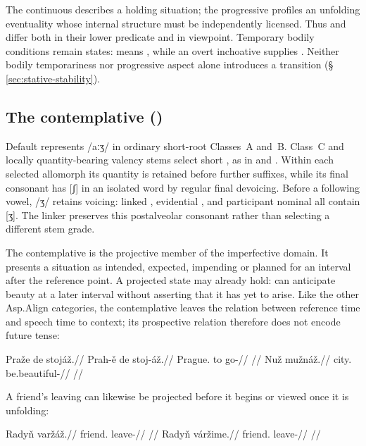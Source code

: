 The continuous describes a holding situation; the progressive profiles an
unfolding eventuality whose internal structure must be independently licensed.
Thus  and  differ both in their
lower predicate and in viewpoint. Temporary bodily conditions remain states:
 means , while an overt inchoative supplies
. Neither bodily temporariness nor progressive aspect
alone introduces a transition (§\,\ref{sec:stative-stability}).


\subsection{The contemplative ()}
Default  represents /aːʒ/ in ordinary short-root
Classes~A and~B. Class~C and locally quantity-bearing valency stems
select short , as in  and .
Within each selected allomorph its quantity is retained before further
suffixes, while its final consonant has [ʃ] in an isolated
word by regular final devoicing. Before a following vowel, /ʒ/ retains
voicing: linked , evidential , and
participant nominal  all contain [ʒ]. The linker
preserves this postalveolar consonant rather than selecting a different
stem grade.

The contemplative is the projective member of the imperfective domain. It
presents a situation as intended, expected, impending or planned for an
interval after the reference point. A projected state may already hold:
 can anticipate beauty at a later interval without asserting
that it has yet to arise. Like the other Asp.Align categories, the
contemplative leaves the relation between reference time and speech time to
context; its prospective relation therefore does not encode future tense:

\pex
\a
\begingl
\gla Praže de stojáž.//
\glb Prah-ě de stoj-áž.//
\glc Prague.\Ind{} to go-\Ctpl{}//
\glft {}//
\endgl
\a
\begingl
\gla Nuž mužnáž.//
\glb city.\Dir{} be.beautiful-\Ctpl{}//
\glft {}//
\endgl
\xe

A friend's leaving can likewise be projected before it begins or viewed
once it is unfolding:

\pex\label{ex:vm-slot-projection-process}
\a
\begingl
\gla Radyň varžáž.//
\glb friend.\Dir{} leave-\Ctpl{}//
\glft {}
//
\endgl
\a
\begingl
\gla Radyň váržime.//
\glb friend.\Dir{} leave-\Prog{}//
\glft {}
//
\endgl
\xe

